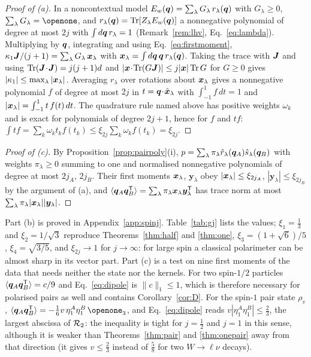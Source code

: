 \begin{proof}[Proof of (a)]
In a noncontextual model $E_w(\bm{q})=\sum_\lambda G_\lambda\,r_\lambda(\bm{q})$ with $G_\lambda\ge0$, $\sum_\lambda G_\lambda=\openone$, and $r_\lambda(\bm{q})=\operatorname{Tr}[Z_\lambda E_w(\bm{q})]$ a nonnegative polynomial of degree at most $2j$ with $\int d\bm{q}\,r_\lambda=1$ (Remark~\ref{rem:lhv}, Eq.~\eqref{eq:lambda}). Multiplying by $\bm{q}$, integrating and using Eq.~\eqref{eq:firstmoment}, $\kappa_1\bm{J}/(j+1)=\sum_\lambda G_\lambda\,\bm{x}_\lambda$ with $\bm{x}_\lambda=\int d\bm{q}\,\bm{q}\,r_\lambda(\bm{q})$. Taking the trace with $\bm{J}$ and using $\operatorname{Tr}(\bm{J}\!\cdot\!\bm{J})=j(j+1)d$ and $|\bm{x}\!\cdot\!\operatorname{Tr}(G\bm{J})|\le j|\bm{x}|\operatorname{Tr} G$ for $G\ge0$ gives $|\kappa_1|\le\max_\lambda|\bm{x}_\lambda|$. Averaging $r_\lambda$ over rotations about $\bm{x}_\lambda$ gives a nonnegative polynomial $f$ of degree at most $2j$ in $t=\bm{q}\!\cdot\!\hat{\bm{x}}_\lambda$ with $\int_{-1}^1f\,dt=1$ and $|\bm{x}_\lambda|=\int_{-1}^1t\,f(t)\,dt$. The quadrature rule named above has positive weights $\omega_k$ and is exact for polynomials of degree $2j+1$, hence for $f$ and $tf$: $\int tf=\sum_k\omega_kt_kf(t_k)\le\xi_{2j}\sum_k\omega_kf(t_k)=\xi_{2j}$.
\end{proof}

\begin{proof}[Proof of (c)]
By Proposition~\ref{prop:pairpoly}(i), $p=\sum_\lambda\pi_\lambda\hat r_\lambda(\bm{q}_A)\hat s_\lambda(\bm{q}_B)$ with weights $\pi_\lambda\ge0$ summing to one and normalised nonnegative polynomials of degree at most $2j_A$, $2j_B$. Their first moments $\bm{x}_\lambda$, $\bm{y}_\lambda$ obey $|\bm{x}_\lambda|\le\xi_{2j_A}$, $|\bm{y}_\lambda|\le\xi_{2j_B}$ by the argument of (a), and $\langle\bm{q}_A\bm{q}_B^{\mathsf{T}}\rangle=\sum_\lambda\pi_\lambda\bm{x}_\lambda\bm{y}_\lambda^{\mathsf{T}}$ has trace norm at most $\sum_\lambda\pi_\lambda|\bm{x}_\lambda||\bm{y}_\lambda|$.
\end{proof}

Part (b) is proved in Appendix~\ref{app:spinj}. Table~\ref{tab:gj} lists the values; $\xi_1=\tfrac13$ and $\xi_2=1/\sqrt3$ reproduce Theorems~\ref{thm:half} and \ref{thm:one}, $\xi_3=(1+\sqrt6)/5$, $\xi_4=\sqrt{3/5}$, and $\xi_{2j}\to1$ for $j\to\infty$: for large spin a classical polarimeter can be almost sharp in its vector part. Part (c) is a test on nine first moments of the data that needs neither the state nor the kernels. For two spin-$1/2$ particles $\langle\bm{q}_A\bm{q}_B^{\mathsf{T}}\rangle=c/9$ and Eq.~\eqref{eq:dipole} is $\|c\|_1\le1$, which is therefore necessary for polarised pairs as well and contains Corollary~\ref{cor:D}. For the spin-$1$ pair state $\rho_v$, $\langle\bq_A\bq_B^{\T}\rangle=-\tfrac16v\,\eta_1^A\eta_1^B\,\openone_3$, and Eq.~\eqref{eq:dipole} reads $v|\eta_1^A\eta_1^B|\le\tfrac23$, the largest abscissa of $\mathcal{R}_2$: the inequality is tight for $j=\tfrac12$ and $j=1$ in this sense, although it is weaker than Theorems~\ref{thm:pair} and \ref{thm:onepair} away from that direction (it gives $v\le\tfrac23$ instead of $\tfrac58$ for two $W\to\ell\nu$ decays).

